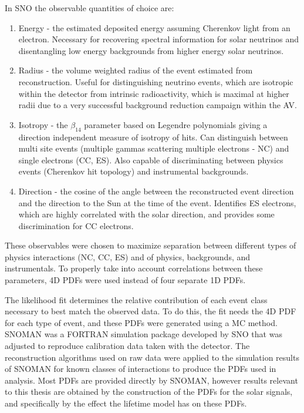 In SNO the observable quantities of choice are:
\begin{enumerate}
    \item Energy - the estimated deposited energy assuming Cherenkov light from an electron. Necessary for recovering spectral information for solar neutrinos and disentangling low energy backgrounds from higher energy solar neutrinos.
    \item Radius - the volume weighted radius of the event estimated from reconstruction. Useful for distinguishing neutrino events, which are isotropic within the detector from intrinsic radioactivity, which is maximal at higher radii due to a very successful background reduction campaign within the AV.
    \item Isotropy - the $\beta_{14}$ parameter based on Legendre polynomials giving a direction independent measure of isotropy of hits. Can distinguish between multi site events (multiple gammas scattering multiple electrons - NC) and single electrons (CC, ES). Also capable of discriminating between physics events (Cherenkov hit topology) and instrumental backgrounds.
    \item Direction - the cosine of the angle between the reconstructed event direction and the direction to the Sun at the time of the event. Identifies ES electrons, which are highly correlated with the solar direction, and provides some discrimination for CC electrons.
\end{enumerate}
These observables were chosen to maximize separation between different types of physics interactions (NC, CC, ES) and of physics, backgrounds, and instrumentals. 
To properly take into account correlations between these parameters, 4D PDFs were used instead of four separate 1D PDFs.

The likelihood fit determines the relative contribution of each event class necessary to best match the observed data.
To do this, the fit needs the 4D PDF for each type of event, and these PDFs were generated using a MC method.
SNOMAN \cite{sno_nim} was a FORTRAN simulation package developed by SNO that was adjusted to reproduce calibration data taken with the detector.
The reconstruction algorithms used on raw data were applied to the simulation results of SNOMAN for known classes of interactions to produce the PDFs used in analysis.
Most PDFs are provided directly by SNOMAN, however results relevant to this thesis are obtained by the construction of the PDFs for the solar signals, and specifically by the effect the lifetime model has on these PDFs.

